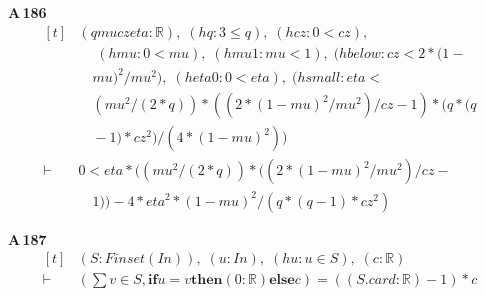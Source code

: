 \noindent\textbf{A\,186}\quad{}
{\footnotesize\[ \begin{aligned}[t]
&(\mathit{q} \mathit{mu} \mathit{cz} \mathit{eta} : \mathbb{R} ),\; (\mathit{hq} : 3 \leq \mathit{q}),\; (\mathit{hcz} : 0 < \mathit{cz}),\\
&\quad \; (\mathit{hmu} : 0 < \mathit{mu}),\; (\mathit{hmu1} : \mathit{mu} < 1),\; (\mathit{hbelow} : \mathit{cz} < 2*(1-\\
&\quad \mathit{mu})^{2}/\mathit{mu}^{2}),\; (\mathit{heta0} : 0 < \mathit{eta}),\; (\mathit{hsmall} : \mathit{eta} <\\
&\quad (\mathit{mu}^{2}/(2*\mathit{q}))*((2*(1-\mathit{mu})^{2}/\mathit{mu}^{2})/\mathit{cz}-1)*(\mathit{q}*(\mathit{q}\\
&\quad -1)*\mathit{cz}^{2})/(4*(1-\mathit{mu})^{2}))\\
\vdash\;&0 < \mathit{eta}*((\mathit{mu}^{2}/(2*\mathit{q}))*((2*(1-\mathit{mu})^{2}/\mathit{mu}^{2})/\mathit{cz}-\\
&\quad 1))-4*\mathit{eta}^{2}*(1-\mathit{mu})^{2}/(\mathit{q}*(\mathit{q}-1)*\mathit{cz}^{2})
\end{aligned} \]}

\noindent\textbf{A\,187}\quad{}
{\footnotesize\[ \begin{aligned}[t]
&(\mathit{S} : \mathit{Finset} (\mathit{I} \mathit{n})),\; (\mathit{u} : \mathit{I} \mathit{n}),\; (\mathit{hu} : \mathit{u} \in \mathit{S}),\; (\mathit{c} : \mathbb{R} )\\
\vdash\;&(\textstyle\sum \mathit{v} \in \mathit{S}, \mathbf{if} \mathit{u} = \mathit{v} \mathbf{then} (0:\mathbb{R} ) \mathbf{else} \mathit{c}) = ((\mathit{S}.\mathit{card} : \mathbb{R} )-1)*\mathit{c}
\end{aligned} \]}
